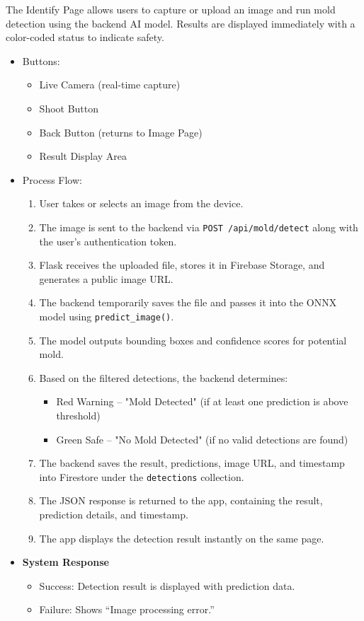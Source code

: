 \documentclass[conference]{IEEEtran}
\begin{document}
\noindent The Identify Page allows users to capture or upload an image and run mold detection using the backend AI model. 
Results are displayed immediately with a color-coded status to indicate safety.

\begin{itemize}
    \item Buttons:
    \begin{itemize}
        \item Live Camera (real-time capture)
        \item Shoot Button
        \item Back Button (returns to Image Page)
        \item Result Display Area
    \end{itemize}

    \item Process Flow:
    \begin{enumerate}
        \item User takes or selects an image from the device.
        \item The image is sent to the backend via 
              \texttt{POST /api/mold/detect} along with the user's authentication token.
        \item Flask receives the uploaded file, stores it in Firebase Storage, and generates a public image URL.
        \item The backend temporarily saves the file and passes it into the ONNX model using \texttt{predict\_image()}.
        \item The model outputs bounding boxes and confidence scores for potential mold.
        \item Based on the filtered detections, the backend determines:
        \begin{itemize}
            \item Red Warning – "Mold Detected" (if at least one prediction is above threshold)
            \item Green Safe – "No Mold Detected" (if no valid detections are found)
        \end{itemize}
        \item The backend saves the result, predictions, image URL, and timestamp into Firestore under the \texttt{detections} collection.
        \item The JSON response is returned to the app, containing the result, prediction details, and timestamp.
        \item The app displays the detection result instantly on the same page.
    \end{enumerate}

    \item \textbf{System Response}
    \begin{itemize}
        \item Success: Detection result is displayed with prediction data.
        \item Failure: Shows ``Image processing error.''
    \end{itemize}
\end{itemize}
\end{document}
